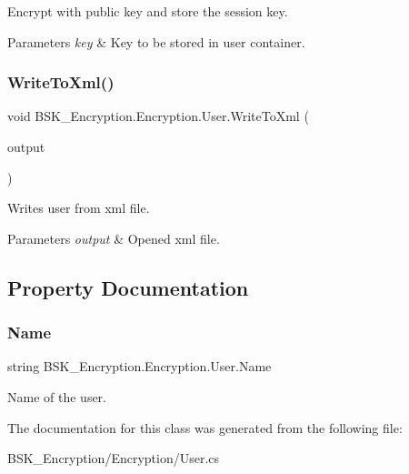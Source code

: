 Encrypt with public key and store the session key. 


\begin{DoxyParams}{Parameters}
{\em key} & Key to be stored in user container.\\
\hline
\end{DoxyParams}
\mbox{\label{class_b_s_k___encryption_1_1_encryption_1_1_user_a881a5e8ff2f140aa2c05be2213522a5f}} 
\subsubsection{\texorpdfstring{Write\+To\+Xml()}{WriteToXml()}}
{\footnotesize\ttfamily void B\+S\+K\+\_\+\+Encryption.\+Encryption.\+User.\+Write\+To\+Xml (\begin{DoxyParamCaption}\item[{Xml\+Writer}]{output }\end{DoxyParamCaption})}



Writes user from xml file. 


\begin{DoxyParams}{Parameters}
{\em output} & Opened xml file.\\
\hline
\end{DoxyParams}


\subsection{Property Documentation}
\mbox{\label{class_b_s_k___encryption_1_1_encryption_1_1_user_a00edfd3ff33285f11bc3dfdb2657f2a9}} 
\subsubsection{\texorpdfstring{Name}{Name}}
{\footnotesize\ttfamily string B\+S\+K\+\_\+\+Encryption.\+Encryption.\+User.\+Name\hspace{0.3cm}{\ttfamily [get]}}



Name of the user. 



The documentation for this class was generated from the following file\+:\begin{DoxyCompactItemize}
\item 
B\+S\+K\+\_\+\+Encryption/\+Encryption/User.\+cs\end{DoxyCompactItemize}
